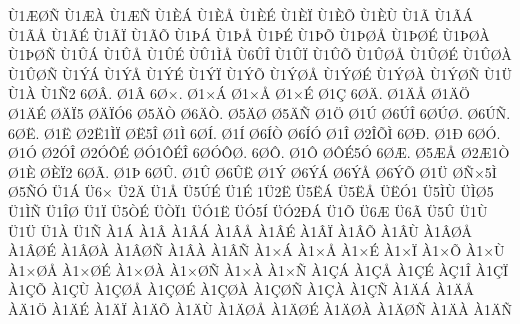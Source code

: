 {^^d91^^c6^^d8^^d1
^^d91^^c6^^c0
^^d91^^c6^^d1
^^d91^^c8^^c1
^^d91^^c8^^c5
^^d91^^c8^^c9
^^d91^^c8^^cf
^^d91^^c8^^d5
^^d91^^c8^^d9
^^d91^^c3
^^d91^^c3^^c1
^^d91^^c3^^c5
^^d91^^c3^^c9
^^d91^^c3^^cf
^^d91^^c3^^d5
^^d91^^de^^c1
^^d91^^de^^c5
^^d91^^de^^c9
^^d91^^de^^d5
^^d91^^de^^d8^^c5
^^d91^^de^^d8^^c9
^^d91^^de^^d8^^c0
^^d91^^de^^d8^^d1
^^d91^^db^^c1
^^d91^^db^^c5
^^d91^^db^^c9
^^d9^^db1^^cc^^c5
^^d96^^db^^ce
^^d91^^db^^cf
^^d91^^db^^d5
^^d91^^db^^d8^^c5
^^d91^^db^^d8^^c9
^^d91^^db^^d8^^c0
^^d91^^db^^d8^^d1
^^d91^^dd^^c1
^^d91^^dd^^c5
^^d91^^dd^^c9
^^d91^^dd^^cf
^^d91^^dd^^d5
^^d91^^dd^^d8^^c5
^^d91^^dd^^d8^^c9
^^d91^^dd^^d8^^c0
^^d91^^dd^^d8^^d1
^^d91^^dc
^^d91^^c0
^^d91^^d12
6^^d8^^c2.
^^d81^^c2
6^^d8^^d7.
^^d81^^d7^^c1
^^d81^^d7^^c5
^^d81^^d7^^c9
^^d81^^c7
6^^d8^^c4.
^^d81^^c4^^c5
^^d81^^c4^^d6
^^d81^^c4^^c9
^^d8^^c4^^cf5
^^d8^^c4^^cf^^d36
^^d85^^c4^^d2
^^d86^^c4^^d2.
^^d85^^c4^^d8
^^d85^^c4^^d1
^^d81^^d6
^^d81^^da
^^d86^^da^^ce
6^^d8^^da^^d8.
^^d86^^da^^d1.
6^^d8^^cb.
^^d81^^cb
^^d82^^cb1^^cc^^cf
^^d8^^cb5^^ce
^^d81^^cc
6^^d8^^cd.
^^d81^^cd
^^d86^^cd^^d2
^^d86^^cd^^d3
^^d81^^ce
^^d82^^ce^^d5^^cc
6^^d8^^d0.
^^d81^^d0
6^^d8^^d3.
^^d81^^d3
^^d82^^d3^^ce
^^d82^^d3^^d4^^c9
^^d8^^d31^^d4^^c9^^ce
6^^d8^^d3^^d4^^d8.
6^^d8^^d4.
^^d81^^d4
^^d8^^d4^^c95^^d3
6^^d8^^c6.
^^d85^^c6^^c5
^^d82^^c61^^d2
^^d81^^c8
^^d8^^c8^^cf2
6^^d8^^c3.
^^d81^^de
6^^d8^^db.
^^d81^^db
^^d86^^db^^cb
^^d81^^dd
^^d86^^dd^^c1
^^d86^^dd^^c5
^^d86^^dd^^d5
^^d81^^dc
^^d8^^d1^^d75^^cc
^^d85^^d1^^d3
^^dc1^^c1
^^dc6^^d7
^^dc2^^c4
^^dc1^^c5
^^dc5^^da^^c9
^^dc1^^c9
1^^dc2^^cb
^^dc5^^cb^^c1
^^dc5^^cb^^c5
^^dc^^cb^^d31
^^dc5^^cc^^d9
^^dc^^cc^^d85
^^dc1^^cc^^d1
^^dc1^^ce^^d8
^^dc1^^cf
^^dc5^^d2^^c9
^^dc^^d2^^cf1
^^dc^^d31^^cb
^^dc^^d35^^cd
^^dc^^d32^^d0^^c1
^^dc1^^d5
^^dc6^^c6
^^dc6^^c3
^^dc5^^db
^^dc1^^d9
^^dc1^^dc
^^dc1^^c0
^^dc1^^d1
^^c01^^c1
^^c01^^c2
^^c01^^c2^^c1
^^c01^^c2^^c5
^^c01^^c2^^c9
^^c01^^c2^^cf
^^c01^^c2^^d5
^^c01^^c2^^d9
^^c01^^c2^^d8^^c5
^^c01^^c2^^d8^^c9
^^c01^^c2^^d8^^c0
^^c01^^c2^^d8^^d1
^^c01^^c2^^c0
^^c01^^c2^^d1
^^c01^^d7^^c1
^^c01^^d7^^c5
^^c01^^d7^^c9
^^c01^^d7^^cf
^^c01^^d7^^d5
^^c01^^d7^^d9
^^c01^^d7^^d8^^c5
^^c01^^d7^^d8^^c9
^^c01^^d7^^d8^^c0
^^c01^^d7^^d8^^d1
^^c01^^d7^^c0
^^c01^^d7^^d1
^^c01^^c7^^c1
^^c01^^c7^^c5
^^c01^^c7^^c9
^^c0^^c71^^ce
^^c01^^c7^^cf
^^c01^^c7^^d5
^^c01^^c7^^d9
^^c01^^c7^^d8^^c5
^^c01^^c7^^d8^^c9
^^c01^^c7^^d8^^c0
^^c01^^c7^^d8^^d1
^^c01^^c7^^c0
^^c01^^c7^^d1
^^c01^^c4^^c1
^^c01^^c4^^c5
^^c0^^c41^^d6
^^c01^^c4^^c9
^^c01^^c4^^cf
^^c01^^c4^^d5
^^c01^^c4^^d9
^^c01^^c4^^d8^^c5
^^c01^^c4^^d8^^c9
^^c01^^c4^^d8^^c0
^^c01^^c4^^d8^^d1
^^c01^^c4^^c0
^^c01^^c4^^d1
}
